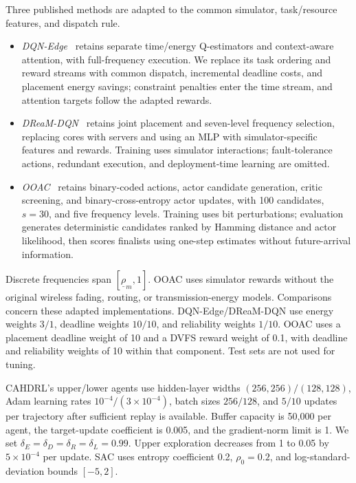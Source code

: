 \documentclass[journal]{IEEEtran}
\begin{document}
Three published methods are adapted to the common simulator,
task/resource features, and dispatch rule.

\begin{itemize}
    \item \emph{DQN-Edge}~\cite{wen2026} retains separate
    time/energy Q-estimators and context-aware attention,
    with full-frequency execution. We replace its task
    ordering and reward streams with common dispatch,
    incremental deadline costs, and placement energy savings;
    constraint penalties enter the time stream, and attention
    targets follow the adapted rewards.

    \item \emph{DReaM-DQN}~\cite{esnaashari2025dream} retains
    joint placement and seven-level frequency selection,
    replacing cores with servers and using an MLP with
    simulator-specific features and rewards. Training uses
    simulator interactions; fault-tolerance actions,
    redundant execution, and deployment-time learning
    are omitted.

    \item \emph{OOAC}~\cite{wang2025ordinal} retains
    binary-coded actions, actor candidate generation,
    critic screening, and binary-cross-entropy actor updates,
    with 100 candidates, $s=30$, and five frequency levels.
    Training uses bit perturbations; evaluation generates
    deterministic candidates ranked by Hamming distance
    and actor likelihood, then scores finalists using
    one-step estimates without future-arrival information.
\end{itemize}

Discrete frequencies span $[\underline\rho_m,1]$.
OOAC uses simulator rewards without the original wireless
fading, routing, or transmission-energy models.
Comparisons concern these adapted implementations.
DQN-Edge/DReaM-DQN use energy weights $3/1$, deadline
weights $10/10$, and reliability weights $1/10$.
OOAC uses a placement deadline weight of 10 and a DVFS
reward weight of 0.1, with deadline and reliability weights
of 10 within that component. Test sets are not used for tuning.

CAHDRL's upper/lower agents use hidden-layer widths
$(256,256)/(128,128)$, Adam learning rates
$10^{-4}/(3\times10^{-4})$, batch sizes $256/128$, and
$5/10$ updates per trajectory after sufficient replay
is available. Buffer capacity is 50,000 per agent,
the target-update coefficient is 0.005, and the gradient-norm
limit is 1. We set
$\delta_E=\delta_D=\delta_R=\delta_L=0.99$.
Upper exploration decreases from 1 to 0.05 by
$5\times10^{-4}$ per update.
SAC uses entropy coefficient 0.2, $\rho_0=0.2$,
and log-standard-deviation bounds $[-5,2]$.
\end{document}
